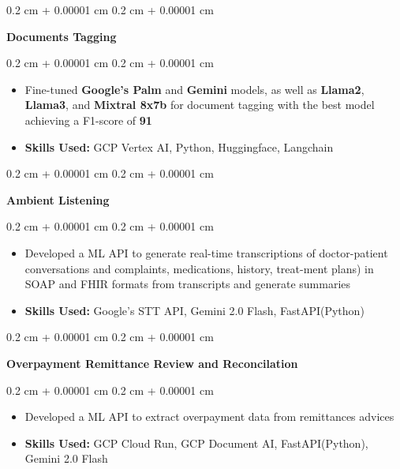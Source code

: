 \documentclass[10pt, letterpaper]{article}
\newenvironment{highlights}{
    \begin{itemize}[
        topsep=0.10 cm,
        parsep=0.10 cm,
        partopsep=0pt,
        itemsep=0pt,
        leftmargin=0.4 cm + 10pt
    ]
}{
    \end{itemize}
} %
\newenvironment{onecolentry}{
    \begin{adjustwidth}{
        0.2 cm + 0.00001 cm
    }{
        0.2 cm + 0.00001 cm
    }
}{
    \end{adjustwidth}
} %
\begin{document}
        \vspace{0.2 cm}

        \begin{onecolentry}
            \textbf{Documents Tagging}
        \end{onecolentry}
        \vspace{0.10 cm}
        \begin{onecolentry}
            \begin{highlights}
                \item Fine-tuned \textbf{Google’s Palm} and \textbf{Gemini} models, as well as \textbf{Llama2}, \textbf{Llama3}, and \textbf{Mixtral 8x7b} for document tagging with the best model achieving a F1-score of \textbf{91}
                \item \textbf{Skills Used:} GCP Vertex AI, Python, Huggingface, Langchain
            \end{highlights}
        \end{onecolentry}
        
        \vspace{0.2 cm}

        \begin{onecolentry}
            \textbf{Ambient Listening}
        \end{onecolentry}
        \vspace{0.10 cm}
        \begin{onecolentry}
            \begin{highlights}
                \item Developed a ML API to generate real-time transcriptions of doctor-patient conversations and complaints, medications, history, treat-ment plans) in SOAP and FHIR formats from transcripts 
                and generate summaries
                \item \textbf{Skills Used:} Google's STT API, Gemini 2.0 Flash, FastAPI(Python)
            \end{highlights}
        \end{onecolentry}

        \vspace{0.2 cm}
        
        \begin{onecolentry}
            \textbf{Overpayment Remittance Review and Reconcilation}
        \end{onecolentry}
        \vspace{0.10 cm}
        \begin{onecolentry}
            \begin{highlights}
                \item Developed a ML API to extract overpayment data from remittances advices
                \item \textbf{Skills Used:} GCP Cloud Run, GCP Document AI, FastAPI(Python), Gemini 2.0 Flash
            \end{highlights}
        \end{onecolentry}
        
\end{document}

